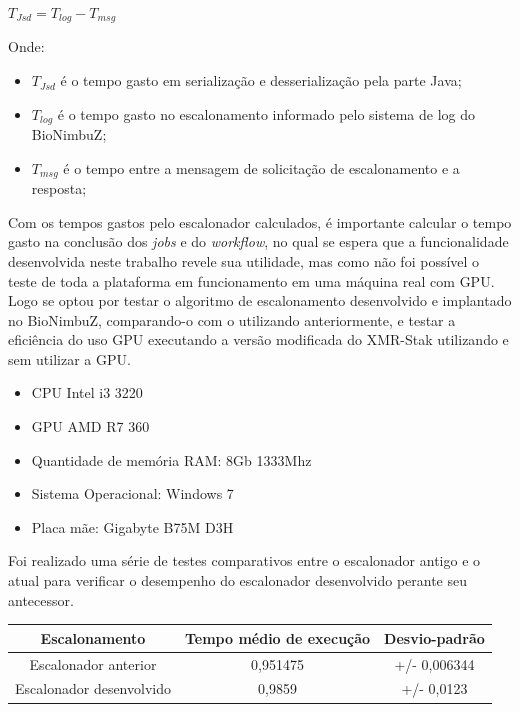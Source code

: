 \centerline{ $T_{Jsd} = T_{log} - T_{msg}$ }

Onde: 
\begin{itemize}
	\item $T_{Jsd}$ é o tempo gasto em serialização e desserialização pela parte Java;
	\item $T_{log}$ é o tempo gasto no escalonamento informado pelo sistema de log do BioNimbuZ;
	\item $T_{msg}$ é o tempo entre a mensagem de solicitação de escalonamento e a resposta;
\end{itemize}

Com os tempos gastos pelo escalonador calculados, é importante calcular o tempo gasto na conclusão dos \textit{jobs} e do \textit{workflow}, no qual se espera que a funcionalidade desenvolvida neste trabalho revele sua utilidade, mas como não foi possível o teste de toda a plataforma em funcionamento em uma máquina real com \acrshort{GPU}. Logo se optou por testar o algoritmo de escalonamento desenvolvido e implantado no BioNimbuZ, comparando-o com o utilizando anteriormente, e testar a eficiência do uso GPU executando a versão modificada do XMR-Stak utilizando e sem utilizar a \acrshort{GPU}.

\begin{itemize}
	\item \acrshort{CPU} Intel i3 3220
	\item \acrshort{GPU} AMD R7 360
	\item Quantidade de memória \acrshort{RAM}: 8Gb 1333Mhz
	\item Sistema Operacional: Windows 7
	\item Placa mãe: Gigabyte B75M D3H
\end{itemize}

Foi realizado uma série de testes comparativos entre o escalonador antigo e o atual para verificar o desempenho do escalonador desenvolvido perante seu antecessor.

\begin{center}
	\begin{tabular}{ |c|c|c| } 
		\hline
		Escalonamento & Tempo médio de execução & Desvio-padrão \\ 
		\hline
		Escalonador anterior & 0,951475 & +/- 0,006344 \\ 
		\hline
		Escalonador desenvolvido & 0,9859 & +/- 0,0123 \\ 
		\hline
	\end{tabular}
\end{center}

